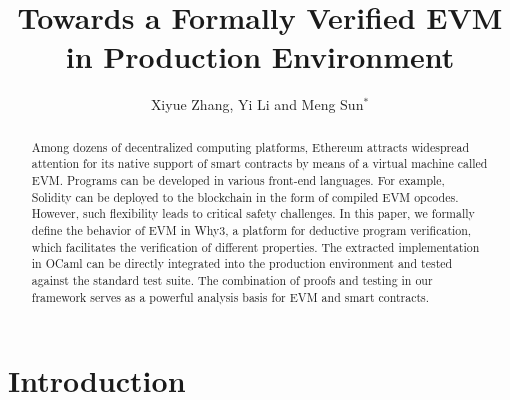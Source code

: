 \documentclass[runningheads]{llncs}
\begin{document}
\title{Towards a Formally Verified EVM in Production Environment}

\author{Xiyue Zhang,
Yi Li and
Meng Sun$^*$
}


\maketitle              %

\begin{abstract}
Among dozens of decentralized computing platforms, Ethe\-reum attracts widespread attention for its native support of smart contracts by means of a virtual machine called EVM. Programs can be developed in various front-end languages. For example, Solidity can be deployed to the blockchain in the form of compiled EVM opcodes. However, such flexibility leads to critical safety challenges. In this paper, we formally define the behavior of EVM in Why3, a platform for deductive program verification, which facilitates the verification of different properties. The extracted implementation in OCaml can be directly integrated into the production environment and tested against the standard test suite. The combination of proofs and testing in our framework serves as a powerful analysis basis for EVM and smart contracts.

\end{abstract}

\section{Introduction}
\end{document}
